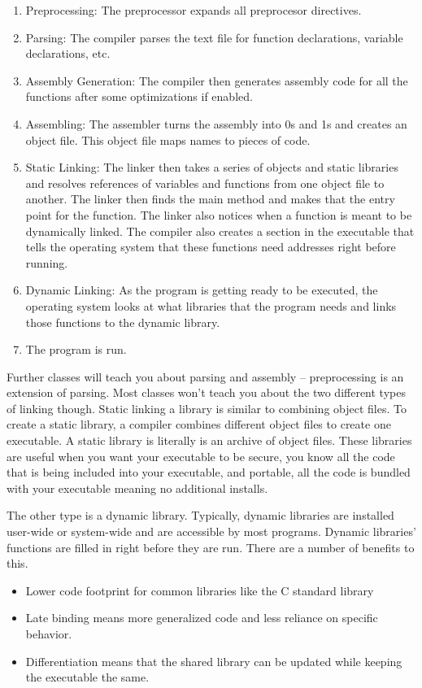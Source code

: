 \begin{enumerate}
\item Preprocessing: The preprocessor expands all preprocesor directives.
\item Parsing: The compiler parses the text file for function declarations, variable declarations, etc.
\item Assembly Generation: The compiler then generates assembly code for all the functions after some optimizations if enabled.
\item Assembling: The assembler turns the assembly into 0s and 1s and creates an object file. This object file maps names to pieces of code.
\item Static Linking: The linker then takes a series of objects and static libraries and resolves references of variables and functions from one object file to another. The linker then finds the main method and makes that the entry point for the function. The linker also notices when a function is meant to be dynamically linked. The compiler also creates a section in the executable that tells the operating system that these functions need addresses right before running. 
\item Dynamic Linking: As the program is getting ready to be executed, the operating system looks at what libraries that the program needs and links those functions to the dynamic library.
\item The program is run.
\end{enumerate}

Further classes will teach you about parsing and assembly -- preprocessing is an extension of parsing.
Most classes won't teach you about the two different types of linking though.
Static linking a library is similar to combining object files.
To create a static library, a compiler combines different object files to create one executable.
A static library is literally is an archive of object files.
These libraries are useful when you want your executable to be secure, you know all the code that is being included into your executable, and portable, all the code is bundled with your executable meaning no additional installs.

The other type is a dynamic library.
Typically, dynamic libraries are installed user-wide or system-wide and are accessible by most programs.
Dynamic libraries' functions are filled in right before they are run.
There are a number of benefits to this.

\begin{itemize}
\item Lower code footprint for common libraries like the C standard library
\item Late binding means more generalized code and less reliance on specific behavior.
\item Differentiation means that the shared library can be updated while keeping the executable the same.
\end{itemize}


